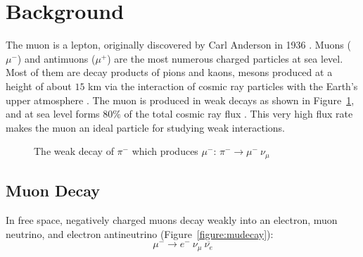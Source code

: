 
\section{Background}\label{background}

The muon is a lepton, originally discovered by Carl Anderson in 1936
\cite{anderson}. Muons ($\mu^-$) and antimuons ($\mu^+$) are the most
numerous charged particles at sea level\cite{pdg}. Most of them are
decay products of pions and kaons, mesons produced at a height of
about $15$ km via the interaction of cosmic ray particles with the
Earth's upper atmosphere \cite{amsler}. The muon is produced in weak
decays as shown in Figure~\ref{figure:pidecay}, and at sea level forms
$80\%$ of the total cosmic ray flux \cite[p.~8]{rossi}. This very high
flux rate makes the muon an ideal particle for studying weak
interactions.

\begin{figure}[h]
\begin{center}
\caption{The weak decay of $\pi^-$ which produces $\mu^-$: $\pi^- \rightarrow
\mu^-~\nu_{\mu}$}
\label{figure:pidecay}
\end{center}
\end{figure}


\subsection{Muon Decay}

In free space, negatively charged muons decay weakly into an electron,
muon neutrino, and electron antineutrino \cite{easwar}
(Figure~\ref{figure:mudecay}):
\begin{equation}\mu^- \rightarrow e^-~\nu_{\mu}~\overline{\nu_e}\label{mudecay}\end{equation}


